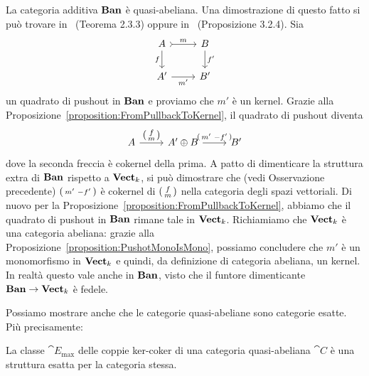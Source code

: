 \begin{example}
  La categoria additiva \(\mathbf{Ban}\) è quasi-abeliana. Una dimostrazione di
  questo fatto si può trovare in~\cite{buehler:boundedcohomology}
  (Teorema 2.3.3) oppure in~\cite{schneiders:quasi-abelian}
  (Proposizione 3.2.4). Sia
  \[
    \begin{tikzcd}
      A \ar["{f}", d, swap] \ar["{m}", rightarrowtail, r] & B \ar["{f'}", d] \\
      A' \ar["{m'}", r, swap] & B'
    \end{tikzcd}
  \]
  un quadrato di pushout in \(\mathbf{Ban}\) e proviamo che \(m'\) è un
  kernel. Grazie alla
  Proposizione~\ref{proposition:FromPullbackToKernel}, il quadrato di
  pushout diventa
  \[
    \begin{tikzcd}[ampersand replacement=\&]
      A \ar["{\begin{psmallmatrix} f \\ m \end{psmallmatrix}}", r] \& A'
      \oplus B \ar["{\begin{psmallmatrix} m' & -f' \end{psmallmatrix}}",
      r] \& B'
    \end{tikzcd}
  \]
  dove la seconda freccia è cokernel della prima. A patto di dimenticare
  la struttura extra di \(\mathbf{Ban}\) rispetto a \(\mathbf{Vect}_k\), si può
  dimostrare che (vedi Osservazione precedente)
  \(\begin{psmallmatrix} m' & -f' \end{psmallmatrix}\) è cokernel di
  \(\begin{psmallmatrix} f \\ m \end{psmallmatrix}\) nella categoria
  degli spazi vettoriali. Di nuovo per la
  Proposizione~\ref{proposition:FromPullbackToKernel}, abbiamo che il
  quadrato di pushout in \(\mathbf{Ban}\) rimane tale in
  \(\mathbf{Vect}_k\). Richiamiamo che \(\mathbf{Vect}_k\) è una categoria abeliana:
  grazie alla Proposizione~\ref{proposition:PushotMonoIsMono}, possiamo
  concludere che \(m'\) è un monomorfismo in \(\mathbf{Vect}_k\) e quindi, da
  definizione di categoria abeliana, un kernel. In realtà questo vale
  anche in \(\mathbf{Ban}\), visto che il funtore dimenticante
  \(\mathbf{Ban} \to \mathbf{Vect}_k\) è fedele.
\end{example}

Possiamo mostrare anche che le categorie quasi-abeliane sono categorie
esatte. Più precisamente:

\begin{proposition}
  La classe \(\cat E_{\max}\) delle coppie ker-coker di una categoria
  quasi-abeliana \(\cat C\) è una struttura esatta per la categoria
  stessa.
\end{proposition}

